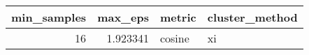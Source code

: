 \begin{tabular}{rrll}
\toprule
min_samples & max_eps & metric & cluster_method \\
\midrule
16 & 1.923341 & cosine & xi \\
\bottomrule
\end{tabular}
